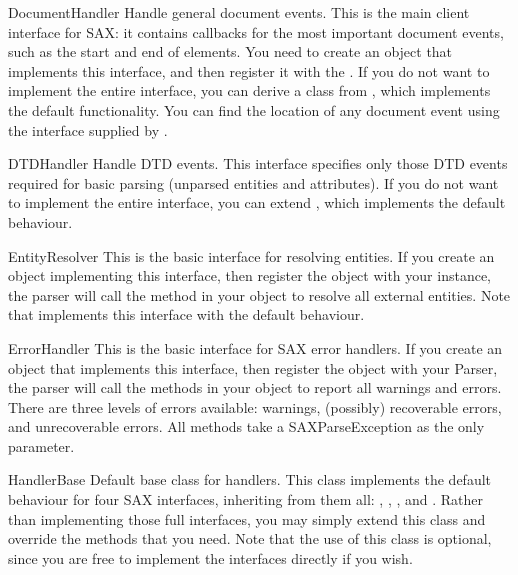\documentclass{howto}
\begin{document}
\begin{classdesc}{DocumentHandler}{}
Handle general document events. This is the main client
    interface for SAX: it contains callbacks for the most important
    document events, such as the start and end of elements. You need
    to create an object that implements this interface, and then
    register it with the . If you do not want to implement
    the entire interface, you can derive a class from ,
    which implements the default functionality. You can find the
    location of any document event using the  interface
    supplied by .
\end{classdesc}

\begin{classdesc}{DTDHandler}{}
Handle DTD events. This interface specifies only those DTD
    events required for basic parsing (unparsed entities and
    attributes). If you do not want to implement the entire interface,
    you can extend , which implements the default
    behaviour.
\end{classdesc}

\begin{classdesc}{EntityResolver}{}
This is the basic interface for resolving entities. If you create an object
    implementing this interface, then register the object with your
     instance, the parser will call the method in your object to
    resolve all external entities. Note that  implements
    this interface with the default behaviour.
\end{classdesc}

\begin{classdesc}{ErrorHandler}{}
This is the basic interface for SAX error handlers. If you create an object
    that implements this interface, then register the object with your
    Parser, the parser will call the methods in your object to report
    all warnings and errors. There are three levels of errors
    available: warnings, (possibly) recoverable errors, and
    unrecoverable errors. All methods take a SAXParseException as the
    only parameter.
\end{classdesc}

\begin{classdesc}{HandlerBase}{}
Default base class for handlers. This class implements the default
    behaviour for four SAX interfaces, inheriting from them all:
    , ,
    , and .  Rather than
    implementing those full interfaces, you may simply extend this
    class and override the methods that you need. Note that the use of
    this class is optional, since you are free to implement the
    interfaces directly if you wish.
\end{classdesc}
\end{document}
